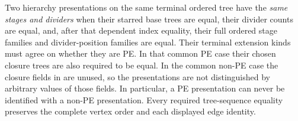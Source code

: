 \begin{definition}
Two hierarchy presentations on the same terminal ordered tree have the
\emph{same stages and dividers} when their starred base trees are equal,
their divider counts are equal, and, after that dependent index
equality, their full ordered stage families and divider-position families
are equal.  Their terminal extension kinds must agree on whether they
are PE.  In that common PE case their chosen closure trees are also
required to be equal.  In the common non-PE case the closure fields in
 are unused, so the presentations are not
distinguished by arbitrary values of those fields.  In particular, a
PE presentation can never be identified with a non-PE presentation.
Every required tree-sequence equality preserves the complete vertex
order and each displayed edge identity.
\end{definition}
